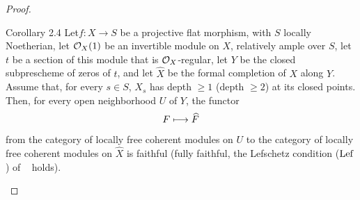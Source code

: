 \begin{proof}
\label{XII.2.4}
\begin{enonce*}{Corollary 2.4\ndemark}
Let\pageoriginale $f:X\to S$ be a projective flat morphism, with $S$ locally Noetherian, let $\mathcal O_X(1)$ be an invertible module on $X$, relatively ample over $S$, let $t$ be a section of this module that is $\mathcal O_X$-regular, let $Y$ be the closed subprescheme of zeros of $t$, and let $\widehat{X}$ be the formal completion of $X$ along $Y$. Assume that, for every $s\in S$, $X_s$ has depth $\geq 1$ (\resp depth $\geq 2$) at its closed points. Then, for every open neighborhood $U$ of $Y$, the functor
\[
F \longmapsto \widehat{F}
\]
from the category of locally free coherent modules on $U$ to the category of locally free coherent modules on $\widehat{X}$ is faithful (\resp fully faithful, \ie the Lefschetz condition ($\operatorname{Lef}$) of ~ holds).
\end{enonce*}


\end{proof}

